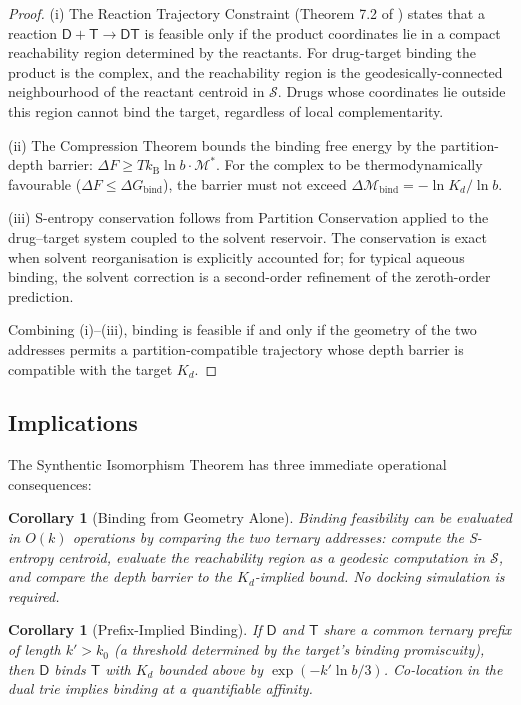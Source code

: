 \documentclass[11pt,twocolumn,a4paper]{article}
\newtheorem{corollary}[theorem]{Corollary}
\theoremstyle{definition}
\theoremstyle{remark}
\newcommand{\kB}{k_{\mathrm{B}}}
\newcommand{\Sspace}{\mathcal{S}}
\newcommand{\Depth}{\mathcal{M}}
\newcommand{\Drug}{\mathsf{D}}
\newcommand{\Target}{\mathsf{T}}
\begin{document}
\begin{proof}
(i) The Reaction Trajectory Constraint (Theorem 7.2 of \citep{sachikonye2025d}) states that a reaction $\Drug + \Target \to \Drug\Target$ is feasible only if the product coordinates lie in a compact reachability region determined by the reactants. For drug-target binding the product is the complex, and the reachability region is the geodesically-connected neighbourhood of the reactant centroid in $\Sspace$. Drugs whose coordinates lie outside this region cannot bind the target, regardless of local complementarity.

(ii) The Compression Theorem bounds the binding free energy by the partition-depth barrier: $\Delta F \geq T \kB \ln b \cdot \Depth^*$. For the complex to be thermodynamically favourable ($\Delta F \leq \Delta G_{\mathrm{bind}}$), the barrier must not exceed $\Delta\Depth_{\mathrm{bind}} = -\ln K_d / \ln b$.

(iii) S-entropy conservation follows from Partition Conservation applied to the drug--target system coupled to the solvent reservoir. The conservation is exact when solvent reorganisation is explicitly accounted for; for typical aqueous binding, the solvent correction is a second-order refinement of the zeroth-order prediction.

Combining (i)--(iii), binding is feasible if and only if the geometry of the two addresses permits a partition-compatible trajectory whose depth barrier is compatible with the target $K_d$.
\end{proof}

\subsection{Implications}

The Synthentic Isomorphism Theorem has three immediate operational consequences:

\begin{corollary}[Binding from Geometry Alone]
\label{cor:binding_geometry}
Binding feasibility can be evaluated in $O(k)$ operations by comparing the two ternary addresses: compute the S-entropy centroid, evaluate the reachability region as a geodesic computation in $\Sspace$, and compare the depth barrier to the $K_d$-implied bound. No docking simulation is required.
\end{corollary}

\begin{corollary}[Prefix-Implied Binding]
\label{cor:prefix_binding}
If $\Drug$ and $\Target$ share a common ternary prefix of length $k' > k_0$ (a threshold determined by the target's binding promiscuity), then $\Drug$ binds $\Target$ with $K_d$ bounded above by $\exp(-k' \ln b / 3)$. Co-location in the dual trie \emph{implies} binding at a quantifiable affinity.
\end{corollary}
\end{document}
